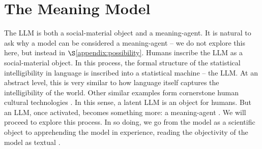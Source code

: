 \section{The Meaning Model}\label{sec:model}


The LLM is both a social-material object and a meaning-agent.
It is natural to ask why a model can be considered a meaning-agent -- we do not explore this here, but instead in $\S$\ref{appendix:possibility}.
Humans inscribe the LLM as a social-material object. In this process, the formal structure of the statistical intelligibility in language \citep{doi:10.1080/00437956.1954.11659520, Lonergan:Insight} is inscribed into a statistical machine -- the LLM. At an abstract level, this is very similar to how language itself captures the intelligibility of the world. Other similar examples form cornerstone human cultural technologies \citep{YiuGopnik:CulturalTechnologies}. In this sense, a latent LLM is an object for humans. But an LLM, once activated, becomes something more: a meaning-agent \cite{Arcas:MachinesBehave}. We will proceed to explore this process. In so doing, we go from the model as a scientific object to apprehending the model in experience, reading the objectivity of the model as textual \citep{Hegel:PhG, Gadamer:TruthAndMethod, Heidegger:BeingAndTime}. 


